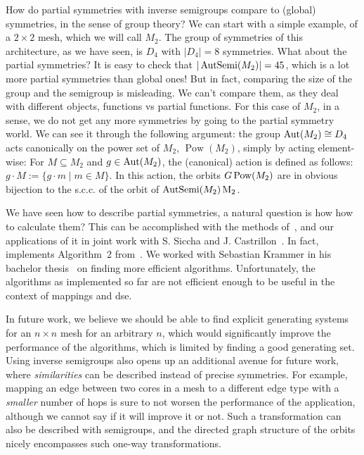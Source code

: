 How do partial symmetries with inverse semigroups compare to (global) symmetries, in the sense of group theory?
We can start with a simple example, of a $2\times 2$ mesh, which we will call $M_2$. The group of symmetries of this architecture, as we have seen, is $D_4$ with $|D_4| = 8$ symmetries.
What about the partial symmetries? It is easy to check that $|\operatorname{AutSemi}(M_2)| = 45$, which is a lot more partial symmetries than global ones! But in fact, comparing the size of the group and the semigroup is misleading.
We can't compare them, as they deal with different objects, functions vs partial functions. For this case of $M_2$, in a sense, we do not get any more symmetries by going to the partial symmetry world.
We can see it through the following argument: the group $\operatorname{Aut}(M_2) \cong D_4$ acts canonically on the power set of $M_2$, $\operatorname{Pow}(M_2)$, simply by acting element-wise:
For $M \subseteq M_2$ and $g \in \operatorname{Aut}(M_2)$, the (canonical) action is defined as follows: $g \cdot M := \{ g \cdot m \mid m \in M \}$.
In this action, the orbits $G \\ \operatorname{Pow}(M_2)$ are in obvious bijection to the s.c.c. of the orbit of $\operatorname{AutSemi}(M_2) \\ \operatorname{M_2}$.

We have seen how to describe partial symmetries, a natural question is how how to calculate them?
This can be accomplished with the methods of~\cite{east2019semigroups}, and our applications of it in joint work with S. Siccha and J. Castrillon~\cite{goens_taco17}.
In fact, \mpsym implements Algorithm~2 from~\cite{goens_taco17}.
We worked with Sebastian Krammer in his bachelor thesis~\cite{krammer_bachelor} on finding more efficient algorithms. 
Unfortunately, the algorithms as implemented so far are not efficient enough to be useful in the context of mappings and \ac{dse}.

In future work, we believe we should be able to find explicit generating systems for an $n \times n$ mesh for an arbitrary $n$, which would significantly improve the performance of the algorithms, which is limited by finding a good generating set.
Using inverse semigroups also opens up an additional avenue for future work, where \emph{similarities} can be described instead of precise symmetries. 
For example, mapping an edge between two cores in a mesh to a different edge type with a \emph{smaller} number of hops is sure to not worsen the performance of the application, although we cannot say if it will improve it or not.
Such a transformation can also be described with semigroups, and the directed graph structure of the orbits nicely encompasses such one-way transformations.
